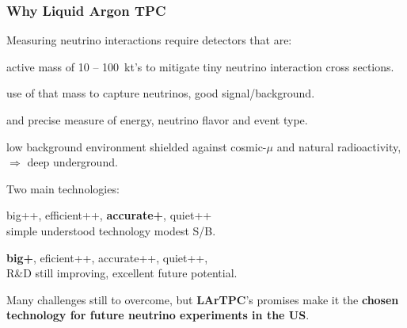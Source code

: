 \documentclass[xcolor=dvipsnames]{beamer}
\begin{document}
\begin{frame}
  \frametitle{Why Liquid Argon TPC}
  Measuring neutrino interactions require detectors that are:
  \begin{description}\footnotesize
  \item[big] active mass of \num{10} -- \SI{100}{\kilo\tonne}'s to
    mitigate tiny neutrino interaction cross sections.
  \item[efficient] use of that mass to capture neutrinos, good signal/background.
  \item[accurate] and precise measure of energy, neutrino flavor and event type.
  \item[quiet] low background environment shielded against
    cosmic-$\mu$ and natural radioactivity, $\Rightarrow$ deep
    underground.
  \end{description}

  Two main technologies:
  \begin{description}\footnotesize
  \item[Water Cherenkov] big++, efficient++, \textbf{accurate+}, quiet++\\
    simple understood technology modest S/B.
  \item[LArTPC] \textbf{big+}, eficient++, accurate++, quiet++, \\
    R\&D still improving, excellent future potential.
  \end{description}

  Many challenges still to overcome, but \textbf{LArTPC}'s promises make it the
  \textbf{chosen technology for future neutrino experiments in the US}.
\end{frame}
\end{document}
